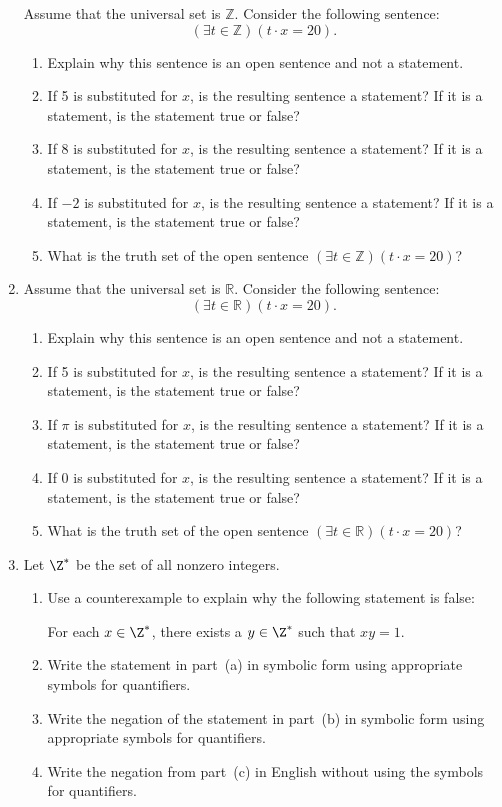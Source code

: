 \begin{enumerate}
\xitem Assume that the universal set is  $\mathbb{Z}$.  Consider the following sentence: \label{Exer:quantifier1}
\[
\left( {\exists t \in \mathbb{Z}} \right)\left( {t \cdot x = 20} \right).
\]
  \begin{enumerate}
    \item Explain why this sentence is an open sentence and not a statement.
    \item If  5  is substituted for  $x$, is the resulting sentence a statement?  If it is a statement, is the statement true or false?
    \item If  8  is substituted for  $x$, is the resulting sentence a statement?  If it is a statement, is the statement true or false?
    \item If  $-2$  is substituted for  $x$, is the resulting sentence a statement?  If it is a statement, is the statement true or false?
    \item What is the truth set of the open sentence  $\left( {\exists t \in \mathbb{Z}} \right)\left( {t \cdot x = 20} \right)$?
  \end{enumerate}


\item Assume that the universal set is  $\mathbb{R}$.  Consider the following sentence: \label{Exer:quantifier}
\[
\left( {\exists t \in \mathbb{R}} \right)\left( {t \cdot x = 20} \right).
\]
  \begin{enumerate}
    \item Explain why this sentence is an open sentence and not a statement.
    \item If  5  is substituted for  $x$, is the resulting sentence a statement?  If it is a statement, is the statement true or false?
    \item If  $\pi$  is substituted for  $x$, is the resulting sentence a statement?  If it is a statement, is the statement true or false?
    \item If  $0$  is substituted for  $x$, is the resulting sentence a statement?  If it is a statement, is the statement true or false?
    \item What is the truth set of the open sentence  $\left( {\exists t \in \mathbb{R}} \right)\left( {t \cdot x = 20} \right)$?
  \end{enumerate}

\item Let $\Z^*$ be the set of all nonzero integers.
\begin{enumerate}
  \item Use a counterexample to explain why the following statement is false:
\begin{center}
For each $x \in \Z^*$, there exists a $y \in \Z^*$ such that $xy = 1$.
\end{center}
  \item Write the statement in part~(a) in symbolic form using appropriate symbols for quantifiers.
  \item Write the negation of the statement in part~(b) in symbolic form using appropriate symbols for quantifiers.
  \item Write the negation from part~(c) in English without using the symbols for quantifiers.
\end{enumerate}



\end{enumerate}
